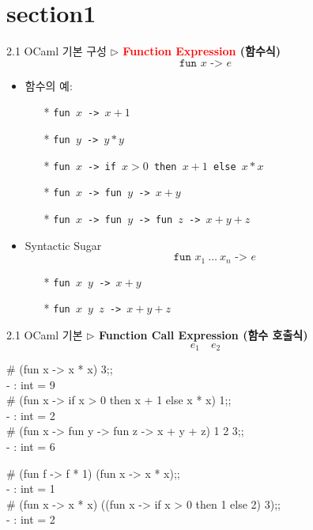 \documentclass[10pt, xcolor=dvipsnames]{beamer}
\begin{document}
	\section{section1}
	\begin{frame}{2.1 OCaml 기본 구성}
		\textbf{$\triangleright$ \textcolor{red}{Function Expression} (함수식)}
		\[
		\texttt{fun $x$ -> $e$}
		\] 
		\begin{itemize}
			\item 함수의 예:
			\begin{itemize}
				\item[*] \texttt{fun $x$ -> $x+1$}
				\item[*] \texttt{fun $y$ -> $y*y$}
				\item[*] \texttt{fun $x$ -> if $x>0$ then $x+1$ else $x*x$}
				\item[*] \texttt{fun $x$ -> fun $y$ -> $x+y$}
				\item[*] \texttt{fun $x$ -> fun $y$ -> fun $z$ -> $x+y+z$}
			\end{itemize}
			\item[]
			\item Syntactic Sugar \[
			\texttt{fun $x_1\ \dots\ x_n$\ ->\ $e$}
			\]
			\begin{itemize}
				\item[*] \texttt{fun $x$ $y$ -> $x+y$}
				\item[*] \texttt{fun $x$ $y$ $z$ -> $x+y+z$}
			\end{itemize}
		\end{itemize}
	\end{frame}
	\begin{frame}{2.1 OCaml 기본}
		\textbf{$\triangleright$ Function Call Expression (함수 호출식)} \[
		e_1\quad e_2
		\]
		\begin{tcolorbox}[colback=backcolor]\ttfamily
			\# (fun x -> x * x) 3;;\\
			- : int = 9\\
			\# (fun x -> if x > 0 then x + 1 else x * x) 1;;\\
			- : int = 2\\
			\# (fun x -> fun y -> fun z -> x + y + z) 1 2 3;;\\
			- : int = 6
		\end{tcolorbox}
		
		\begin{tcolorbox}[colback=backcolor]\ttfamily
			\# (fun f -> f * 1) (fun x -> x * x);;\\
			- : int = 1\\
			\# (fun x -> x * x) ((fun x -> if x > 0 then 1 else 2) 3);;\\
			- : int = 2
		\end{tcolorbox}
	\end{frame}
\end{document}
